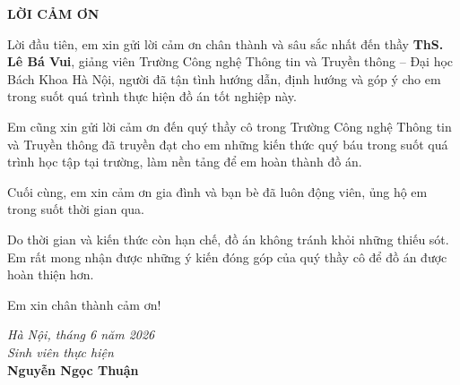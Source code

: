 \documentclass[../main.tex]{subfiles}
\begin{document}
\begin{center}
    {\Large \textbf{LỜI CẢM ƠN}}
\end{center}
\vspace{0.5cm}

Lời đầu tiên, em xin gửi lời cảm ơn chân thành và sâu sắc nhất đến thầy \textbf{ThS. Lê Bá Vui}, giảng viên Trường Công nghệ Thông tin và Truyền thông -- Đại học Bách Khoa Hà Nội, người đã tận tình hướng dẫn, định hướng và góp ý cho em trong suốt quá trình thực hiện đồ án tốt nghiệp này.

Em cũng xin gửi lời cảm ơn đến quý thầy cô trong Trường Công nghệ Thông tin và Truyền thông đã truyền đạt cho em những kiến thức quý báu trong suốt quá trình học tập tại trường, làm nền tảng để em hoàn thành đồ án.

Cuối cùng, em xin cảm ơn gia đình và bạn bè đã luôn động viên, ủng hộ em trong suốt thời gian qua.

Do thời gian và kiến thức còn hạn chế, đồ án không tránh khỏi những thiếu sót. Em rất mong nhận được những ý kiến đóng góp của quý thầy cô để đồ án được hoàn thiện hơn.

Em xin chân thành cảm ơn!

\vspace{1cm}
\begin{flushright}
\textit{Hà Nội, tháng 6 năm 2026}\\[0.3cm]
\textit{Sinh viên thực hiện}\\[1.5cm]
\textbf{Nguyễn Ngọc Thuận}
\end{flushright}
\end{document}
